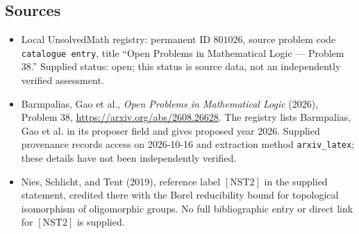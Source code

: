 \documentclass[11pt]{article}
\begin{document}
\subsection{Sources}
\begin{itemize}
\item Local UnsolvedMath registry: permanent ID \(801026\), source problem code \texttt{catalogue entry}, title ``Open Problems in Mathematical Logic --- Problem 38.'' Supplied status: open; this status is source data, not an independently verified assessment.
\item Barmpalias, Gao et al., \emph{Open Problems in Mathematical Logic} (2026), Problem 38, \url{https://arxiv.org/abs/2608.26628}. The registry lists Barmpalias, Gao et al. in its proposer field and gives proposed year 2026. Supplied provenance records access on 2026-10-16 and extraction method \texttt{arxiv\_latex}; these details have not been independently verified.
\item Nies, Schlicht, and Tent (2019), reference label \([\mathrm{NST2}]\) in the supplied statement, credited there with the Borel reducibility bound for topological isomorphism of oligomorphic groups. No full bibliographic entry or direct link for \([\mathrm{NST2}]\) is supplied.
\end{itemize}
\end{document}

